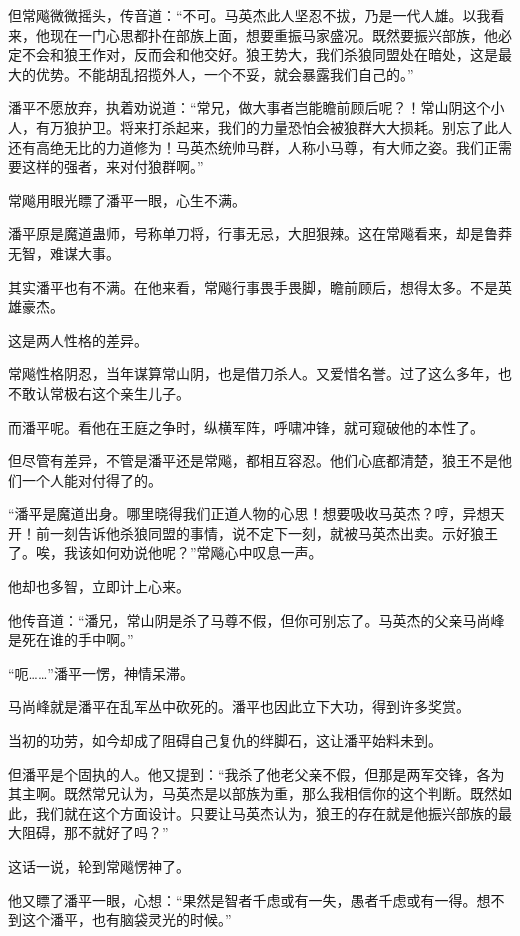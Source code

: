 \begin{this_body}
但常飚微微摇头，传音道：“不可。马英杰此人坚忍不拔，乃是一代人雄。以我看来，他现在一门心思都扑在部族上面，想要重振马家盛况。既然要振兴部族，他必定不会和狼王作对，反而会和他交好。狼王势大，我们杀狼同盟处在暗处，这是最大的优势。不能胡乱招揽外人，一个不妥，就会暴露我们自己的。”

潘平不愿放弃，执着劝说道：“常兄，做大事者岂能瞻前顾后呢？！常山阴这个小人，有万狼护卫。将来打杀起来，我们的力量恐怕会被狼群大大损耗。别忘了此人还有高绝无比的力道修为！马英杰统帅马群，人称小马尊，有大师之姿。我们正需要这样的强者，来对付狼群啊。”

常飚用眼光瞟了潘平一眼，心生不满。

潘平原是魔道蛊师，号称单刀将，行事无忌，大胆狠辣。这在常飚看来，却是鲁莽无智，难谋大事。

其实潘平也有不满。在他来看，常飚行事畏手畏脚，瞻前顾后，想得太多。不是英雄豪杰。

这是两人性格的差异。

常飚性格阴忍，当年谋算常山阴，也是借刀杀人。又爱惜名誉。过了这么多年，也不敢认常极右这个亲生儿子。

而潘平呢。看他在王庭之争时，纵横军阵，呼啸冲锋，就可窥破他的本性了。

但尽管有差异，不管是潘平还是常飚，都相互容忍。他们心底都清楚，狼王不是他们一个人能对付得了的。

“潘平是魔道出身。哪里晓得我们正道人物的心思！想要吸收马英杰？哼，异想天开！前一刻告诉他杀狼同盟的事情，说不定下一刻，就被马英杰出卖。示好狼王了。唉，我该如何劝说他呢？”常飚心中叹息一声。

他却也多智，立即计上心来。

他传音道：“潘兄，常山阴是杀了马尊不假，但你可别忘了。马英杰的父亲马尚峰是死在谁的手中啊。”

“呃……”潘平一愣，神情呆滞。

马尚峰就是潘平在乱军丛中砍死的。潘平也因此立下大功，得到许多奖赏。

当初的功劳，如今却成了阻碍自己复仇的绊脚石，这让潘平始料未到。

但潘平是个固执的人。他又提到：“我杀了他老父亲不假，但那是两军交锋，各为其主啊。既然常兄认为，马英杰是以部族为重，那么我相信你的这个判断。既然如此，我们就在这个方面设计。只要让马英杰认为，狼王的存在就是他振兴部族的最大阻碍，那不就好了吗？”

这话一说，轮到常飚愣神了。

他又瞟了潘平一眼，心想：“果然是智者千虑或有一失，愚者千虑或有一得。想不到这个潘平，也有脑袋灵光的时候。”


\end{this_body}
